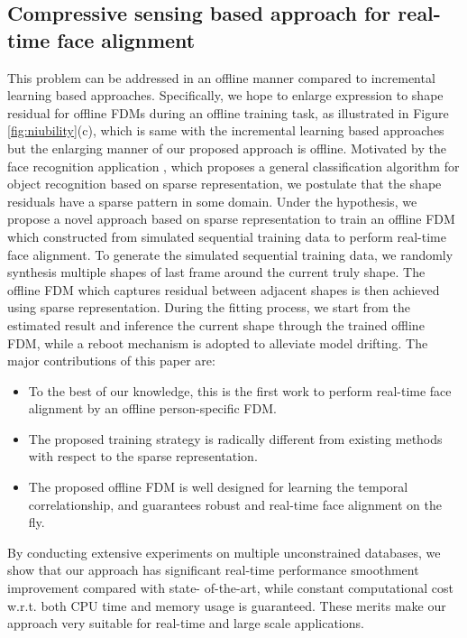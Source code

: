 \documentclass[a4paper, 10pt, conference]{ieeeconf}      %
\begin{document}
\subsection{Compressive sensing based approach for real-time face alignment}
This problem can be addressed in an offline manner compared to incremental learning based approaches. Specifically, we hope to enlarge expression to
shape residual for offline FDMs during an offline training task, as illustrated in Figure \ref{fig:niubility}(c), which is same with the incremental learning based 
approaches but the enlarging manner of our proposed approach is offline. Motivated by the face recognition application \cite{wright2009robust},
which proposes a general classification algorithm for object recognition based on sparse representation,
we postulate that the shape residuals have a sparse pattern in some domain. Under the hypothesis,
we propose a novel approach based on sparse representation to train an offline FDM which constructed
from simulated sequential training data to perform real-time face alignment. To generate the simulated sequential training data,
we randomly synthesis multiple shapes of last frame around the current truly shape. The offline FDM which captures residual between adjacent
shapes is then achieved using sparse representation. During the fitting process, we start from the estimated result and inference the current
shape through the trained offline FDM, while a reboot mechanism is adopted to alleviate model drifting. The major contributions of this paper are: 
\begin{itemize}
	\item To the best of our knowledge, this is the first work to perform real-time face alignment by an offline person-specific FDM.
	\item The proposed training strategy is radically different from existing methods with respect to the sparse representation.
	\item The proposed offline FDM is well designed for learning the temporal correlationship, and guarantees robust and real-time face alignment on
           the fly.
\end{itemize}
By conducting extensive experiments on multiple unconstrained databases, we show that our approach has significant real-time performance
smoothment improvement compared with state- of-the-art, while constant computational cost w.r.t. both CPU time and memory usage is guaranteed.
These merits make our approach very suitable for real-time and large scale applications.
\end{document}
